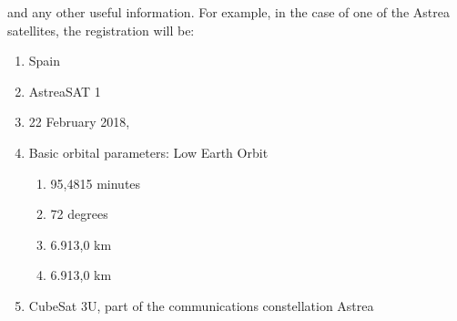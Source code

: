 and any other useful information.
For example, in the case of one of the Astrea satellites, the registration will be:
\begin{enumerate}[label=\alph*)]
\item Spain
\item AstreaSAT 1
\item 22 February 2018, 
\item Basic orbital parameters: Low Earth Orbit
\begin{enumerate}[label=\Roman*)]
\item 95,4815 minutes
\item 72 degrees
\item 6.913,0 km
\item 6.913,0 km
\end{enumerate}
\item CubeSat 3U, part of the communications constellation Astrea
\end{enumerate}
